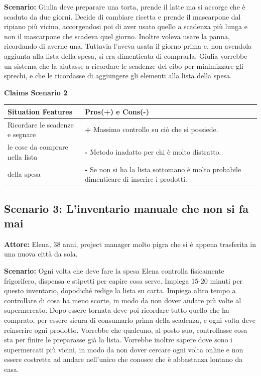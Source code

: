 \documentclass[12pt,a4paper]{article}
\begin{document}
\textbf{Scenario:} Giulia deve preparare una torta, prende il latte ma si accorge che è scaduto da due giorni. Decide di cambiare ricetta e prende il mascarpone dal ripiano più vicino, accorgendosi poi di aver usato quello a scadenza più lunga e non il mascarpone che scadeva quel giorno. Inoltre voleva usare la panna, ricordando di averne una. Tuttavia l'aveva usata il giorno prima e, non avendola aggiunta alla lista della spesa, si era dimenticata di comprarla. Giulia vorrebbe un sistema che la aiutasse a ricordare le scadenze del cibo per minimizzare gli sprechi, e che le ricordasse di aggiungere gli elementi alla lista della spesa.

\vspace{0.5cm}
\noindent\textbf{Claims Scenario 2}

\begin{table}[h]
\centering
\begin{tabularx}{\textwidth}{|l|X|}
\hline
\textbf{Situation Features} & \textbf{Pros(+) e Cons(-)} \\
\hline
Ricordare le scadenze e segnare & \textbf{+} Massimo controllo su ciò che si possiede. \\
le cose da comprare nella lista & \textbf{-} Metodo inadatto per chi è molto distratto. \\
della spesa & \textbf{-} Se non si ha la lista sottomano è molto probabile dimenticare di inserire i prodotti. \\
\hline
\end{tabularx}
\end{table}

\subsection{Scenario 3: L'inventario manuale che non si fa mai}
\textbf{Attore:} Elena, 38 anni, project manager molto pigra che si è appena trasferita in una nuova città da sola.

\textbf{Scenario:} Ogni volta che deve fare la spesa Elena controlla fisicamente frigorifero, dispensa e stipetti per capire cosa serve. Impiega 15-20 minuti per questo inventario, dopodiché redige la lista su carta. Impiega altro tempo a controllare di cosa ha meno scorte, in modo da non dover andare più volte al supermercato. Dopo essere tornata deve poi ricordare tutto quello che ha comprato, per essere sicura di consumarlo prima della scadenza, e ogni volta deve reinserire ogni prodotto. Vorrebbe che qualcuno, al posto suo, controllasse cosa sta per finire le preparasse già la lista. Vorrebbe inoltre sapere dove sono i supermercati più vicini, in modo da non dover cercare ogni volta online e non essere costretta ad andare nell'unico che conosce che è abbastanza lontano da casa.
\end{document}
